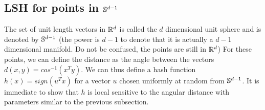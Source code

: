  \subsection{LSH for points in ${\mathbb{S}}^{d-1}$}
The set of unit length vectors in ${\mathbb{R}}^{d}$ is called the $d$ dimensional unit sphere and is denoted by  ${\mathbb{S}}^{d-1}$
(the power is $d-1$ to denote that it is actually a $d-1$ dimensional manifold. Do not be confused, the points are still in ${\mathbb{R}}^d$)
For these points, we can define the distance as the angle between the vectors $d(x,y) = cos^{-1}(x^{T}y)$.
We can thus define a hash function $h(x) = sign(u^{T}x)$ for a vector $u$ chosen uniformly at random from ${\mathbb{S}}^{d-1}$.
It is immediate to show that $h$ is local sensitive to the angular distance with parameters similar to the previous subsection.



















